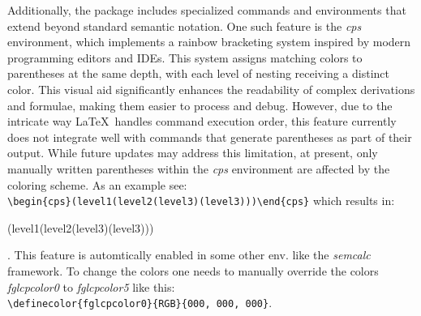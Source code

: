 \documentclass[10pt, a4paper]{article}
\begin{document}
	Additionally, the package includes specialized commands and environments that extend beyond standard semantic notation. One such feature is the \textit{cps} environment, which implements a rainbow bracketing system inspired by modern programming editors and IDEs. This system assigns matching colors to parentheses at the same depth, with each level of nesting receiving a distinct color. This visual aid significantly enhances the readability of complex derivations and formulae, making them easier to process and debug. However, due to the intricate way \LaTeX\ handles command execution order, this feature currently does not integrate well with commands that generate parentheses as part of their output. While future updates may address this limitation, at present, only manually written parentheses within the \textit{cps} environment are affected by the coloring scheme. 
	As an example see: \\\verb=\begin{cps}(level1(level2(level3)(level3)))\end{cps}= which results in:  \\\begin{cps}(level1(level2(level3)(level3)))\end{cps}.
	This feature is automtically enabled in some other env. like the \textit{semcalc} framework. To change the colors one needs to manually override the colors \textit{fglcpcolor0} to \textit{fglcpcolor5} like this: \\\verb=\definecolor{fglcpcolor0}{RGB}{000, 000, 000}=.
	
\end{document}
